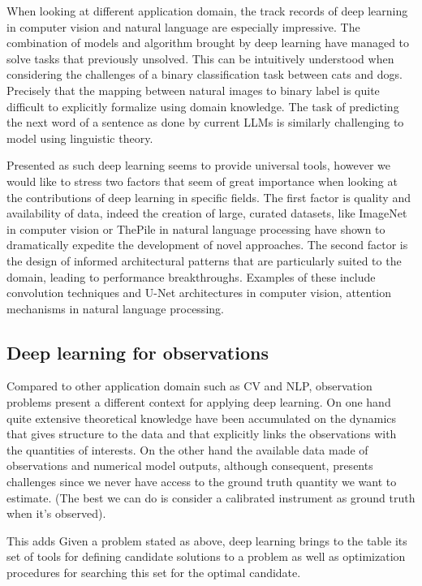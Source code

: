 \begin{bibunit}
When looking at different application domain, the track records of deep learning in computer vision and natural language are especially impressive. 
The combination of models and algorithm brought by deep learning have managed to solve tasks that previously unsolved.
This can be intuitively understood when considering the challenges of a binary classification task between cats and dogs.
Precisely that the mapping between natural images to binary label is quite difficult to explicitly formalize using domain knowledge. 
The task of predicting the next word of a sentence as done by current LLMs is similarly challenging to model using linguistic theory.

Presented as such deep learning seems to provide universal tools,  
however we would like to stress two factors that seem of great importance when looking at the contributions of deep learning in specific fields.
The first factor is quality and availability of data, indeed the creation of large, curated datasets, like ImageNet in computer vision or ThePile in natural language processing have shown to dramatically expedite the development of novel approaches. 
The second factor is the design of informed architectural patterns that are particularly suited to the domain, leading to performance breakthroughs. Examples of these include convolution techniques and U-Net architectures in computer vision, attention mechanisms in natural language processing.



\subsection{Deep learning for observations}
Compared to other application domain such as CV and NLP, observation problems present a different context for applying deep learning. 
On one hand quite extensive theoretical knowledge have been accumulated on the dynamics that gives structure to the data and that explicitly links the observations with the quantities of interests.  
On the other hand the available data made of observations and numerical model outputs, although consequent, presents challenges since we never have access to the ground truth quantity we want to estimate. (The best we can do is consider a calibrated instrument as ground truth when it's observed). 



This adds
Given a problem stated as above, deep learning brings to the table its set of tools for defining candidate solutions to a problem as well as optimization procedures for searching this set for the optimal candidate.


\end{bibunit}

